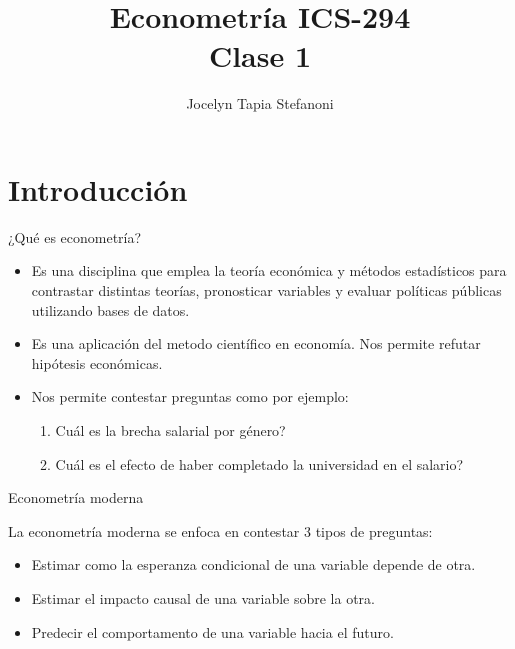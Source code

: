 \documentclass{beamer}
\title[ICS-162]{Econometría ICS-294\\ \small{Clase 1}}
\author{Jocelyn Tapia Stefanoni}
\institute[USM]
{Universidad Técnica Federico Santa María\\ %
	\medskip
	\textit{} %
	
}
\date{}
\begin{document}
	
\begin{frame}
	\titlepage %

\end{frame}
\section{Introducción}
\begin{frame}{¿Qué es econometría?}
 \begin{itemize}
     \item  Es una disciplina que emplea la teor\'ia econ\'omica y m\'etodos estad\'isticos para
contrastar distintas teor\'ias, pronosticar variables y evaluar pol\'iticas p\'ublicas
utilizando bases de datos.
\item  Es una aplicaci\'on del metodo cient\'ifico en econom\'ia. Nos permite refutar
hip\'otesis econ\'omicas.
\item  Nos permite contestar preguntas como por ejemplo:
\begin{enumerate}
    \item Cu\'al es la brecha salarial por g\'enero?
    \item Cu\'al es el efecto de haber completado la universidad en el salario?
\end{enumerate}

 \end{itemize}
 
\end{frame}


\begin{frame}{Econometría moderna}


  La econometr\'ia moderna se enfoca en contestar 3 tipos de preguntas:
  \begin{itemize}
      \item Estimar como la esperanza condicional de una variable depende de otra.
      \item Estimar el impacto causal de una variable sobre la otra.
      \item Predecir el comportamento de una variable hacia el futuro.
  \end{itemize}

\end{frame}
\end{document}
